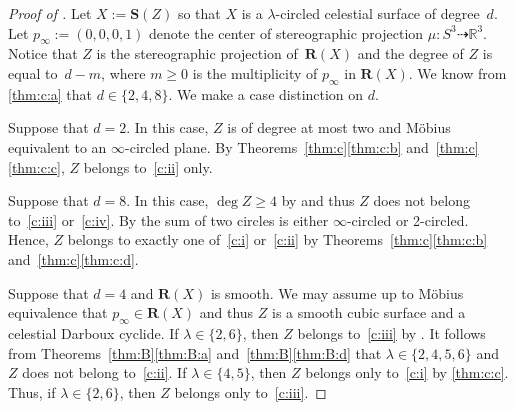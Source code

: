 \documentclass[11pt]{article}
\newcommand{\R}{\mathbb{R}}
\newcommand{\bR}{\mathbf{R}}
\newcommand{\bS}{\mathbf{S}}
\renewcommand{\c}{\colon}
\newcommand{\dto}{\dasharrow}
\begin{document}
\begin{proof}[Proof of ]
Let $X:=\bS(Z)$ so that $X$ is a $\lambda$-circled celestial surface of degree~$d$.
Let $p_\infty:=(0,0,0,1)$ denote the center of stereographic projection $\mu\c S^3\dto \R^3$.
Notice that $Z$ is the stereographic projection of~$\bR(X)$
and the degree of $Z$ is equal to~$d-m$, where $m\geq 0$ is the multiplicity of $p_\infty$ in $\bR(X)$.
We know from \ref{thm:c:a} that $d\in\{2,4,8\}$.
We make a case distinction on $d$.

Suppose that $d=2$.
In this case, $Z$ is of degree at most two and M\"obius equivalent to an $\infty$-circled plane.
By Theorems~\ref{thm:c}\ref{thm:c:b} and~\ref{thm:c}\ref{thm:c:c}, $Z$ belongs to~\ref{c:ii} only.

Suppose that $d=8$.
In this case, $\deg Z\geq 4$ by \citep[Proposition~5]{2021circ}
and thus $Z$ does not belong to~\ref{c:iii} or~\ref{c:iv}.
By \citep[Corollary~2]{2023trans} the sum of two circles is either
$\infty$-circled or 2-circled.
Hence, $Z$ belongs to exactly one of~\ref{c:i} or~\ref{c:ii}
by Theorems~\ref{thm:c}\ref{thm:c:b} and~\ref{thm:c}\ref{thm:c:d}.

Suppose that $d=4$ and $\bR(X)$ is smooth.
We may assume up to M\"obius equivalence that $p_\infty\in \bR(X)$ and thus
$Z$ is a smooth cubic surface and a celestial Darboux cyclide.
If $\lambda\in\{2,6\}$, then
$Z$ belongs to~\ref{c:iii} by .
It follows from Theorems~\ref{thm:B}\ref{thm:B:a} and~\ref{thm:B}\ref{thm:B:d}  that
$\lambda\in \{2,4,5,6\}$ and $Z$ does not belong to~\ref{c:ii}.
If $\lambda\in\{4,5\}$, then $Z$ belongs only to~\ref{c:i} by \ref{thm:c:c}.
Thus, if $\lambda\in\{2,6\}$, then $Z$ belongs only to~\ref{c:iii}.


\end{proof}
\end{document}
